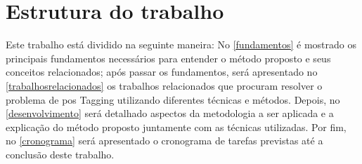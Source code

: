 


\section{Estrutura do trabalho}\label{sec:estruturadotrabalho}

Este trabalho está dividido na seguinte maneira: No \autoref{fundamentos} é mostrado os principais fundamentos necessários para entender o método proposto e seus conceitos relacionados; após passar os fundamentos, será apresentado no \autoref{trabalhosrelacionados} os trabalhos relacionados que procuram resolver o problema de \ac{pos} Tagging utilizando diferentes técnicas e métodos. Depois, no \autoref{desenvolvimento} será detalhado aspectos da metodologia a ser aplicada e a explicação do método proposto juntamente com as técnicas utilizadas. Por fim, no \autoref{cronograma} será apresentado o cronograma de tarefas previstas até a conclusão deste trabalho.

